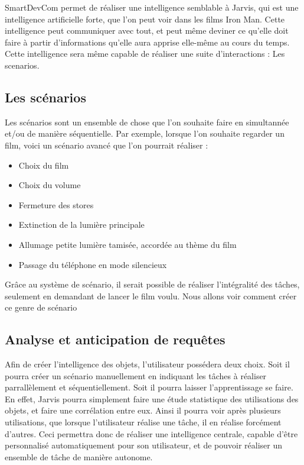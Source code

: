SmartDevCom permet de réaliser une intelligence semblable à Jarvis, qui est une intelligence artificielle 
forte, que l'on peut voir dans les films Iron Man. Cette intelligence peut communiquer avec tout, et peut 
même deviner ce qu'elle doit faire à partir d'informations qu'elle aura apprise elle-même au cours du temps. 
Cette intelligence sera même capable de réaliser une suite d'interactions : Les scenarios.
	\subsection{Les scénarios}
Les scénarios sont un ensemble de chose que l'on souhaite faire en simultannée et/ou de manière séquentielle. 
Par exemple, lorsque l'on souhaite regarder un film, voici un scénario avancé que l'on pourrait réaliser :
\begin{itemize}
 \item Choix du film
 \item Choix du volume
 \item Fermeture des stores
 \item Extinction de la lumière principale
 \item Allumage petite lumière tamisée, accordée au thème du film
 \item Passage du téléphone en mode silencieux 
\end{itemize}

Grâce au système de scénario, il serait possible de réaliser l'intégralité des tâches, seulement en demandant 
de lancer le film voulu. Nous allons voir comment créer ce genre de scénario
	\subsection{Analyse et anticipation de requêtes}
Afin de créer l'intelligence des objets, l'utilisateur possédera deux choix. Soit il pourra créer un scénario 
manuellement en indiquant les tâches à réaliser parrallèlement et séquentiellement. Soit il pourra laisser 
l'apprentissage se faire. En effet, Jarvis pourra simplement faire une étude statistique des utilisations des 
objets, et faire une corrélation entre eux. Ainsi il pourra voir après plusieurs utilisations, que 
lorsque l'utilisateur réalise une tâche, il en réalise forcément d'autres. Ceci permettra donc de réaliser 
une intelligence centrale, capable d'être personnalisé automatiquement pour son utilisateur, et de pouvoir 
réaliser un ensemble de tâche de manière autonome.
